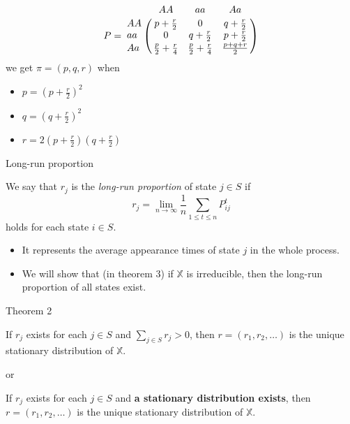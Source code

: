 \documentclass{beamer}
\begin{document}
\begin{frame}
	\begin{example}[cont.]
		\[
		P = 
		\bordermatrix{ ~ & AA                      & aa                      & Aa            \cr
			            AA & p+\frac{r}{2}           & 0                       & q+\frac{r}{2} \cr
			            aa & 0                       & q+\frac{r}{2}           & p+\frac{r}{2} \cr
			            Aa & \frac{p}{2}+\frac{r}{4} & \frac{p}{2}+\frac{r}{4} & \frac{p+q+r}{2} \cr}
		\]
		we get $\pi = (p, q, r)$ when
		\begin{itemize}
			\item $p = {\left( p + \frac{r}{2} \right)}^2$
			\item $q = {\left( q + \frac{r}{2} \right)}^2$
			\item $r = 2 \left( p + \frac{r}{2} \right)\left( q + \frac{r}{2} \right)$
		\end{itemize}
	\end{example}
\end{frame}

\begin{frame}{Long-run proportion}
	\begin{definition}
		We say that $r_j$ is the \textit{long-run proportion} of state $j \in S$ if
		\[
		r_j = \lim_{n\to\infty} \frac{1}{n} \sum_{1 \leq t \leq n} P^t_{ij}
		\]
		holds for each state $i \in S$.
	\end{definition}
	\begin{itemize}
		\item It represents the average appearance times of state $j$ in the whole process.
		\item We will show that (in theorem 3) if $\mathbb{X}$ is irreducible, then the long-run proportion of all states exist.
	\end{itemize}
\end{frame}

\begin{frame}{Theorem 2}
	\begin{theorem}[type 1]
	If $r_j$ exists for each $j \in S$ and $\sum_{j \in S} r_j > 0$,
	then $r = (r_1, r_2, \ldots)$ is the unique stationary distribution of $\mathbb{X}$.
	\end{theorem}
	or
	\begin{theorem}[type 2]
	If $r_j$ exists for each $j \in S$ and \textbf{a stationary distribution exists},
	then $r = (r_1, r_2, \ldots)$ is the unique stationary distribution of $\mathbb{X}$.
	\end{theorem}
\end{frame}
\end{document}
